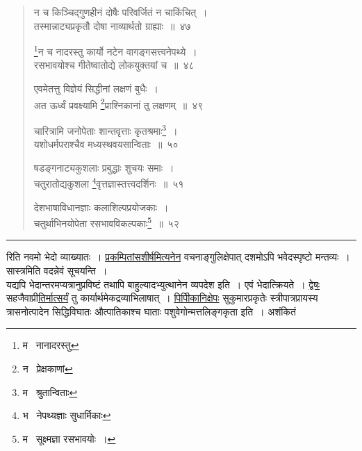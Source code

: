 \documentclass[11pt, openany]{book}
\begin{document}
\begin{quote}
{\na न च किञ्चिद्गुणहीनं दोषैः परिवर्जितं न चाकिंचित्~।\\
तस्मान्नाट्यप्रकृतौ दोषा नाव्यार्थतो ग्राह्याः~॥~४७

\renewcommand{\thefootnote}{1}\footnote{म \textendash\  नानादरस्तु}न च नादरस्तु कार्यो नटेन वागङ्गसत्त्वनेपथ्ये~।\\
रसभावयोश्च गीतेष्वातोद्ये लोकयुक्तयां च~॥~४८

एवमेतत्तु विज्ञेयं सिद्धीनां लक्षणं बुधैः~।\\
अत ऊर्ध्वं प्रवक्ष्यामि \renewcommand{\thefootnote}{2}\footnote{न \textendash\  प्रेक्षकाणां}प्राश्निकानां तु लक्षणम्~॥~४९

चारित्रामि जनोपेताः शान्तवृत्ताः कृतश्रमाः\renewcommand{\thefootnote}{3}\footnote{म \textendash\  श्रुतान्विताः}~।\\
यशोधर्मपराश्चैव मध्यस्थवयसान्विताः~॥~५०

षडङ्गनाट्यकुशलाः प्रबुद्धाः शुचयः समाः~।\\
चतुरातोद्यकुशला \renewcommand{\thefootnote}{4}\footnote{भ \textendash\  नेपथ्यज्ञाः सुधार्मिकाः}वृत्तज्ञास्तत्त्वदर्शिनः~॥~५१ 

देशभाषाविधानज्ञाः कलाशिल्पप्रयोजकाः~।\\
चतुर्थाभिनयोपेता रसभावविकल्पकाः\renewcommand{\thefootnote}{5}\footnote{म \textendash\  सूक्ष्मज्ञा रसभावयोः~।}~॥~५२}
\end{quote}

\hrule

\vspace{2mm}
\noindent
रिति नवमो भेदो व्याख्यातः~। \underline{प्रकम्पितांसशीर्षमित्यनेन} वचनाङ्गुलिक्षेपात् दशमोऽपि भवेदस्पृष्टो मन्तव्यः~। सास्त्रमिति वदन्नेवं सूचयन्ति~।\\

यद्यपि भेदान्तरमप्यत्रानुप्रविष्टं तथापि बाहुल्यादभ्युत्थानेन व्यपदेश इति~। एवं भेदात्क्रियते~। \underline{द्वेषः} सहजैवाप्री\underline{तिर्मात्सर्यं} तु कार्यार्थमेकद्रव्याभिलाषात्~। \underline{पिपीिकानिक्षेपः} सुकुमारप्रकृतेः स्त्रीपात्रप्रायस्य त्रासनोत्पादेन सिद्धिविघातः औत्पातिकाश्च घाताः पशुवेगोन्मत्तलिङ्गकृता इति~। अशंकितं

\newpage
\end{document}
